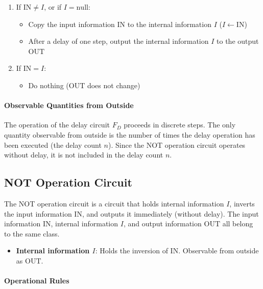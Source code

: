 \documentclass[12pt,a4paper]{article}
\begin{document}
\begin{enumerate}
  \item If $\mathrm{IN} \neq I$, or if $I = \mathrm{null}$:
    \begin{itemize}
      \item Copy the input information $\mathrm{IN}$ to the internal information $I$ ($I \leftarrow \mathrm{IN}$)
      \item After a delay of one step, output the internal information $I$ to the output $\mathrm{OUT}$
    \end{itemize}
  \item If $\mathrm{IN} = I$:
    \begin{itemize}
      \item Do nothing ($\mathrm{OUT}$ does not change)
    \end{itemize}
\end{enumerate}

\paragraph{Observable Quantities from Outside}

The operation of the delay circuit $F_D$ proceeds in discrete steps. The only quantity observable from outside is the number of times the delay operation has been executed (the delay count $n$). Since the NOT operation circuit operates without delay, it is not included in the delay count $n$.

\subsection{NOT Operation Circuit}

The NOT operation circuit is a circuit that holds internal information $I$, inverts the input information $\mathrm{IN}$, and outputs it immediately (without delay). The input information $\mathrm{IN}$, internal information $I$, and output information $\mathrm{OUT}$ all belong to the same class.

\begin{itemize}
  \item \textbf{Internal information $I$}: Holds the inversion of $\mathrm{IN}$. Observable from outside as $\mathrm{OUT}$.
\end{itemize}

\paragraph{Operational Rules}
\end{document}
